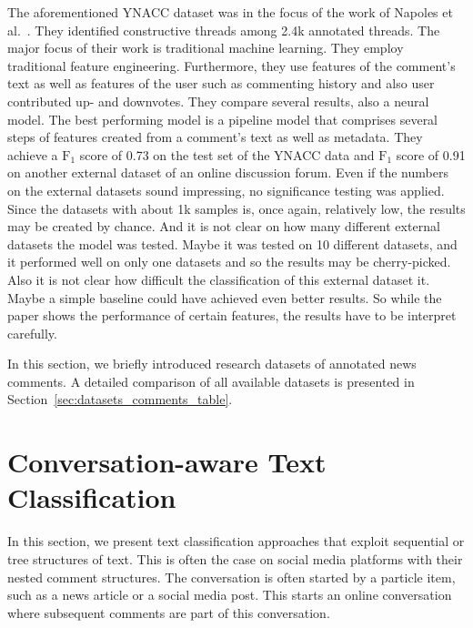 The aforementioned YNACC dataset was in the focus of the work of Napoles et al.~\cite{napoles2017automatically}. They identified constructive threads among 2.4k annotated threads. The major focus of their work is traditional machine learning. They employ traditional feature engineering. Furthermore, they use features of the comment's text as well as features of the user such as commenting history and also user contributed up- and downvotes. They compare several results, also a neural model. The best performing model is a pipeline model that comprises several steps of features created from a comment's text as well as metadata. They achieve a $\text{F}_{1}$ score of 0.73 on the test set of the YNACC data and $\text{F}_{1}$ score of 0.91 on another external dataset of an online discussion forum. Even if the numbers on the external datasets sound impressing, no significance testing was applied. Since the datasets with about 1k samples is, once again, relatively low, the results may be created by chance. And it is not clear on how many different external datasets the model was tested. Maybe it was tested on 10 different datasets, and it performed well on only one datasets and so the results may be cherry-picked. Also it is not clear how difficult the classification of this external dataset it. Maybe a simple baseline could have achieved even better results. So while the paper shows the performance of certain features, the results have to be interpret carefully.

In this section, we briefly introduced research datasets of annotated news comments. A detailed comparison of all available datasets is presented in Section~\ref{sec:datasets_comments_table}.

\section{Conversation-aware Text Classification}
\label{sec:contextawaretext}

In this section, we present text classification approaches that exploit sequential or tree structures of text. This is often the case on social media platforms with their nested comment structures. The conversation is often started by a particle item, such as a news article or a social media post. This starts an online conversation where subsequent comments are part of this conversation.

